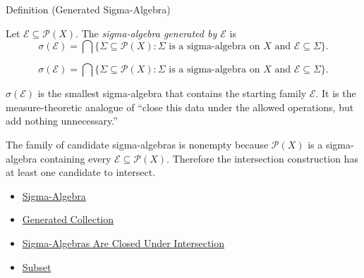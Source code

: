\begin{definitionbox}{Definition (Generated Sigma-Algebra)}
\begin{definition}\label{def:generated-sigma-algebra}
Let \(\mathcal E\subseteq\mathcal P(X)\).  The \emph{sigma-algebra generated
by \(\mathcal E\)} is
\[
  \sigma(\mathcal E)
  =
  \bigcap\{\Sigma\subseteq\mathcal P(X):
    \Sigma\text{ is a sigma-algebra on }X
    \text{ and }\mathcal E\subseteq\Sigma\}.
\]
\end{definition}
\end{definitionbox}

\begin{remark*}
\[
\sigma(\mathcal E)
=
\bigcap\{\Sigma\subseteq\mathcal P(X):
\Sigma\text{ is a sigma-algebra on }X
\text{ and }\mathcal E\subseteq\Sigma\}.
\]
\end{remark*}

\begin{remark*}[Interpretation]
\(\sigma(\mathcal E)\) is the smallest sigma-algebra that contains the
starting family \(\mathcal E\).  It is the measure-theoretic analogue of
``close this data under the allowed operations, but add nothing unnecessary.''
\end{remark*}

\begin{remark*}[Exposition]
The family of candidate sigma-algebras is nonempty because
\(\mathcal P(X)\) is a sigma-algebra containing every
\(\mathcal E\subseteq\mathcal P(X)\).  Therefore the intersection construction
has at least one candidate to intersect.
\end{remark*}


\begin{dependencies}
\begin{itemize}
  \item \hyperref[def:sigma-algebra]{Sigma-Algebra}
  \item \hyperref[def:generated-collection]{Generated Collection}
  \item \hyperref[thm:sigma-algebras-closed-under-intersection]{Sigma-Algebras Are Closed Under Intersection}
  \item \hyperref[def:subset]{Subset}
\end{itemize}
\end{dependencies}

